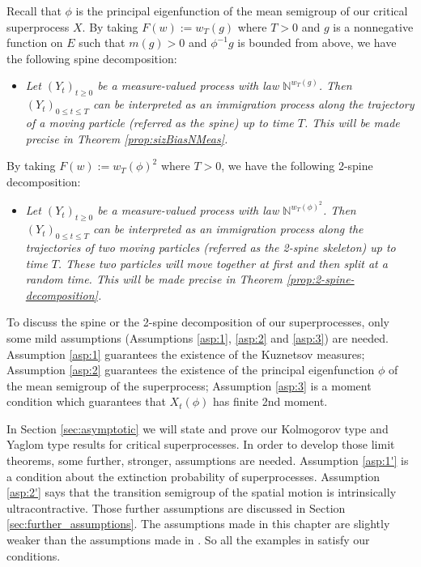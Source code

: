 	Recall that  $\phi$ is the principal eigenfunction of the mean semigroup of our critical superprocess $X$.
	By taking $F(w) := w_T(g)$ where $T > 0$ and $g$ is a nonnegative function on $E$ such that $m(g) > 0$ and $\phi^{-1}g$ is bounded from above, we have the following spine decomposition:
\begin{itemize}
\item
	\emph{Let $(Y_t)_{t\geq 0}$ be a measure-valued process with law $\mathbb N^{w_T(g)}$.
	Then $(Y_t)_{0\leq t\leq T}$ can be interpreted as an immigration process along the trajectory
	of a moving particle (referred as the spine) up to time $T$.
	This will be made precise in Theorem \ref{prop:sizBiasNMeas}.}
\end{itemize}
	By taking $F(w) := w_T(\phi)^2$ where $T>0$, we have the following 2-spine decomposition:
\begin{itemize}
\item
	\emph{Let $(Y_t)_{t\geq 0}$ be a measure-valued process with law $\mathbb N^{w_T(\phi)^2}$.
	Then $(Y_t)_{0\leq t\leq T}$ can be interpreted as an immigration process along the trajectories of two moving particles (referred as the 2-spine skeleton) up to time $T$.
	These two particles will move together at first and then split at a random time.
	This will be made precise in Theorem \ref{prop:2-spine-decomposition}.}
\end{itemize}
\par
	To discuss the spine or the 2-spine decomposition of our superprocesses, only some mild assumptions (Assumptions \ref{asp:1}, \ref{asp:2} and \ref{asp:3}) are needed.
	Assumption \ref{asp:1} guarantees the existence of the Kuznetsov measures;
    Assumption \ref{asp:2} guarantees the existence of the principal eigenfunction $\phi$ of the mean semigroup of the superprocess;
	Assumption \ref{asp:3} is a moment condition which guarantees
	that $X_t(\phi)$ has finite 2nd moment.
\par
	In Section \ref{sec:asymptotic} we will state and prove our Kolmogorov type and Yaglom type results for critical superprocesses.
	In order to develop those limit theorems, some further, stronger, assumptions are needed.
	Assumption \ref{asp:1'} is a condition about the extinction probability of superprocesses.
	Assumption \ref{asp:2'} says that the transition semigroup of the spatial motion is intrinsically ultracontractive.
	Those further assumptions are discussed in Section \ref{sec:further_assumptions}.
	The assumptions made in this chapter are slightly weaker than the assumptions made in \cite{RenSongZhang2015Limit}.
	So all the examples in \cite{RenSongZhang2015Limit} satisfy our conditions.

